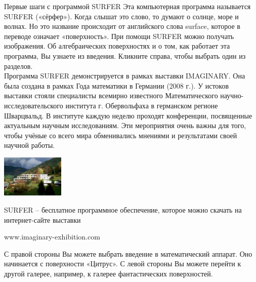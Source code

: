 \begin{surferIntroPage}{Первые шаги с программой SURFER}
Эта компьютерная программа называется SURFER («сёрфер»). Когда слышат это слово, то думают о солнце, море и волнах. Но это название происходит от английского слова surface, которое в переводе означает «поверхность». При помощи SURFER можно получать изображения. Об алгебраических поверхностях и о том, как работает эта программа, Вы узнаете из введения. Кликните справа, чтобы выбрать один из разделов.
\\
Программа SURFER демонстрируется в рамках выставки IMAGINARY. Она была создана в рамках Года математики в Германии (2008 г.). У истоков выставки стояли специалисты всемирно известного Математического научно-исследовательского института г. Обервольфаха в германском регионе Шварцвальд. В институте каждую неделю проходят конференции, посвященные актуальным научным исследованиям. Эти мероприятия очень важны для того, чтобы учёные со всего мира обменивались мнениями и результатами своей научной работы.
\vspace{-1ex}
\begin{center}
\includegraphics[width=3cm]{./../../common/images/photo_mfo.jpg}
\end{center}
\vspace{-2ex}
SURFER – бесплатное программное обеспечение, которое можно скачать на интернет-сайте выставки
\vspace{-3ex}
\begin{center}
www.imaginary-exhibition.com
\end{center}
\vspace{-2ex}
С правой стороны Вы можете выбрать введение в математический аппарат. Оно начинается с поверхности «Цитрус». С левой стороны Вы можете перейти к другой галерее, например, к галерее фантастических поверхностей.
\end{surferIntroPage}
